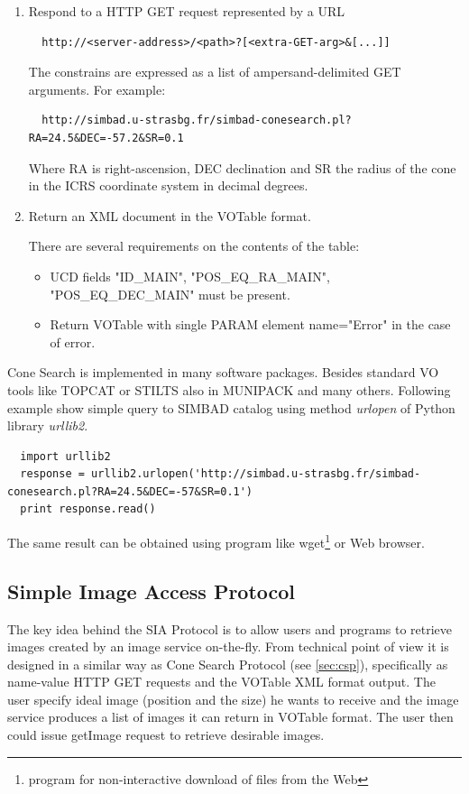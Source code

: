 \begin{enumerate}
\item Respond to a HTTP GET request represented by a URL 

\begin{lstlisting}
  http://<server-address>/<path>?[<extra-GET-arg>&[...]]
\end{lstlisting}

The constrains are expressed as a list of ampersand-delimited GET
arguments. For example:

\begin{lstlisting}
  http://simbad.u-strasbg.fr/simbad-conesearch.pl?RA=24.5&DEC=-57.2&SR=0.1
\end{lstlisting}

Where RA is right-ascension, DEC declination and SR the radius of the
cone in the ICRS coordinate system in decimal degrees. 

\item Return an XML document in the VOTable format.  

  There are several requirements on the contents of the table:

  \begin{itemize}
  \item UCD fields "ID\_MAIN", "POS\_EQ\_RA\_MAIN", "POS\_EQ\_DEC\_MAIN" must
    be present.
  \item Return VOTable with single PARAM element name="Error" in the
    case of error.
  \end{itemize}

\end{enumerate}

Cone Search is implemented in many software packages. Besides standard
VO tools like TOPCAT or STILTS also in MUNIPACK and many others.
Following example show simple query to SIMBAD\cite{wenger2000simbad}
catalog using method \emph{urlopen} of Python library \emph{urllib2}.

\begin{lstlisting}
  import urllib2
  response = urllib2.urlopen('http://simbad.u-strasbg.fr/simbad-conesearch.pl?RA=24.5&DEC=-57&SR=0.1')
  print response.read()
\end{lstlisting}

\noindent The same result can be obtained using program like wget\footnote{program
  for non-interactive download of files from the Web} or Web browser.

\subsection{Simple Image Access Protocol}
The key idea behind the SIA Protocol is to allow users and programs to
retrieve images created by an image service on-the-fly. From technical
point of view it is designed in a similar way as Cone Search Protocol
(see \ref{sec:csp}), specifically as name-value HTTP GET requests and
the VOTable XML format output. The user specify ideal image (position
and the size) he wants to receive and the image service produces a
list of images it can return in VOTable format. The user then could
issue getImage request to retrieve desirable images.

